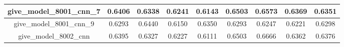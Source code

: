 \begin{table}[!h]
\begin{tabular} {|c|c|c|c|c|c|c|c|c| }
        give\_model\_8001\_cnn\_7         & 0.6406                        & 0.6338                         & 0.6241                      & 0.6143                  & 0.6503 & 0.6573 & 0.6369 & 0.6351 \\ \hline
        give\_model\_8001\_cnn\_9         & 0.6293                        & 0.6440                         & 0.6150                      & 0.6350                  & 0.6293 & 0.6247 & 0.6221 & 0.6298 \\ \hline
        give\_model\_8002\_cnn            & 0.6395                        & 0.6327                         & 0.6227                      & 0.6111                  & 0.6503 & 0.6666 & 0.6362 & 0.6376 \\ \hline
    \end{tabular}
\end{table}


